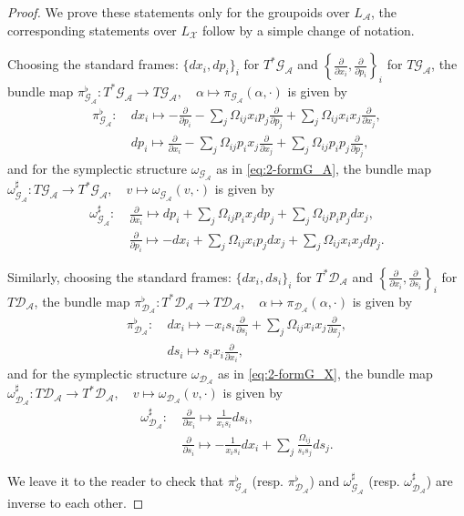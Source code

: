 \documentclass{amsart}
\numberwithin{equation}{section}
\newcommand{\cA}{\mathcal{A}}
\newcommand{\cG}{\mathcal{G}}
\newcommand{\cD}{\mathcal{D}}
\newcommand{\cX}{\mathcal{X}}
\begin{document}
\begin{proof}
  We prove these statements only for the groupoids over $L_\cA$, the corresponding statements over $L_\cX$ follow by a simple change of notation.

  Choosing the standard frames: $\{dx_i, dp_i\}_i$ for $T^*\cG_\cA$ and $\left\{\frac{\partial}{\partial x_i}, \frac{\partial}{\partial p_i}\right\}_i$ for $T\cG_\cA$, the bundle map $\pi_{\cG_\cA}^\flat: T^*\cG_\cA \to T\cG_\cA, \quad \alpha \mapsto \pi_{\cG_\cA}(\alpha, \cdot)$ is given by
  \begin{align*}
    \pi_{\cG_\cA}^\flat: &~ dx_i \mapsto -\frac{\partial}{\partial p_i} - \sum_{j} \Omega_{ij} x_i p_j \frac{\partial}{\partial p_j}+ \sum_{j} \Omega_{ij} x_i x_j \frac{\partial}{\partial x_j}, \\
    &~ dp_i \mapsto \frac{\partial}{\partial x_i} - \sum_{j} \Omega_{ij} p_i x_j \frac{\partial}{\partial x_j}+ \sum_{j} \Omega_{ij} p_i p_j \frac{\partial}{\partial p_j},
  \end{align*}
  and for the symplectic structure $\omega_{\cG_\cA}$ as in \eqref{eq:2-formG_A}, the bundle map $\omega_{\cG_\cA}^\sharp: T\cG_\cA \to T^*\cG_\cA, \quad v \mapsto \omega_{\cG_\cA}(v, \cdot)$ is given by
  \begin{align*}
    \omega_{\cG_\cA}^\sharp: &~ \frac{\partial}{\partial x_i} \mapsto dp_i + \sum_{j} \Omega_{ij} p_i x_j dp_j + \sum_{j} \Omega_{ij} p_i p_j dx_j, \\
    &~ \frac{\partial}{\partial p_i} \mapsto -dx_i + \sum_{j} \Omega_{ij} x_i p_j dx_j + \sum_{j} \Omega_{ij} x_i x_j dp_j.
  \end{align*}

  Similarly, choosing the standard frames: $\{dx_i, ds_i\}_i$ for $T^*\cD_\cA$ and $\left\{\frac{\partial}{\partial x_i}, \frac{\partial}{\partial s_i}\right\}_i$ for $T\cD_\cA$, the bundle map $\pi_{\cD_\cA}^\flat: T^*\cD_\cA \to T\cD_\cA, \quad \alpha \mapsto \pi_{\cD_\cA}(\alpha, \cdot)$ is given by
  \begin{align*}
    \pi_{\cD_\cA}^\flat: &~ dx_i \mapsto -x_i s_i \frac{\partial}{\partial s_i} + \sum_{j} \Omega_{ij} x_i x_j \frac{\partial}{\partial x_j}, \\
    &~ ds_i \mapsto s_i x_i \frac{\partial}{\partial x_i},
  \end{align*}
  and for the symplectic structure $\omega_{\cD_\cA}$ as in \eqref{eq:2-formG_X}, the bundle map $\omega_{\cD_\cA}^\sharp: T\cD_\cA \to T^*\cD_\cA, \quad v \mapsto \omega_{\cD_\cA}(v, \cdot)$ is given by
  \begin{align*}
    \omega_{\cD_\cA}^\sharp: &~ \frac{\partial}{\partial x_i} \mapsto \frac{1}{x_i s_i} ds_i, \\
    &~ \frac{\partial}{\partial s_i} \mapsto -\frac{1}{x_i s_i} dx_i + \sum_{j} \frac{\Omega_{ij}}{s_i s_j} ds_j.
  \end{align*}

  We leave it to the reader to check that $\pi_{\cG_\cA}^\flat$ (resp. $\pi_{\cD_\cA}^\flat$) and $\omega_{\cG_\cA}^\sharp$ (resp. $\omega_{\cD_\cA}^\sharp$) are inverse to each other.
\end{proof}
\end{document}
